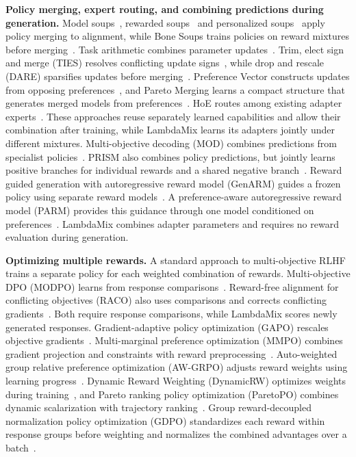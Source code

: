 \documentclass{article} %
\begin{document}
\textbf{Policy merging, expert routing, and combining predictions during generation.} Model soups~\citep{wortsman2022modelsoups}, rewarded soups~\citep{rame2024rewarded} and personalized soups~\citep{jang2023personalized} apply policy merging to alignment, while Bone Soups trains policies on reward mixtures before merging~\citep{bonesoups2025}. Task arithmetic combines parameter updates~\citep{ilharco2023task}. Trim, elect sign and merge (TIES) resolves conflicting update signs~\citep{yadav2023ties}, while drop and rescale (DARE) sparsifies updates before merging~\citep{yu2024dare}. Preference Vector constructs updates from opposing preferences~\citep{prefvector2026}, and Pareto Merging learns a compact structure that generates merged models from preferences~\citep{chen2025paretomerging}. HoE routes among existing adapter experts~\citep{li2026hoe}. These approaches reuse separately learned capabilities and allow their combination after training, while LambdaMix learns its adapters jointly under different mixtures. Multi-objective decoding (MOD) combines predictions from specialist policies~\citep{shi2024mod}. PRISM also combines policy predictions, but jointly learns positive branches for individual rewards and a shared negative branch~\citep{liang2026prism}. Reward guided generation with autoregressive reward model (GenARM) guides a frozen policy using separate reward models~\citep{xu2025genarm}. A preference-aware autoregressive reward model (PARM) provides this guidance through one model conditioned on preferences~\citep{lin2025parm}. LambdaMix combines adapter parameters and requires no reward evaluation during generation.

\textbf{Optimizing multiple rewards.} A standard approach to multi-objective RLHF trains a separate policy for each weighted combination of rewards. Multi-objective DPO (MODPO) learns from response comparisons~\citep{zhou2024modpo}. Reward-free alignment for conflicting objectives (RACO) also uses comparisons and corrects conflicting gradients~\citep{chen2026raco}. Both require response comparisons, while LambdaMix scores newly generated responses. Gradient-adaptive policy optimization (GAPO) rescales objective gradients~\citep{li2025gapo}. Multi-marginal preference optimization (MMPO) combines gradient projection and constraints with reward preprocessing~\citep{mao2026mmpo}. Auto-weighted group relative preference optimization (AW-GRPO) adjusts reward weights using learning progress~\citep{ichihara2025awgrpo}. Dynamic Reward Weighting (DynamicRW) optimizes weights during training~\citep{lu2025dynamicweighting}, and Pareto ranking policy optimization (ParetoPO) combines dynamic scalarization with trajectory ranking~\citep{paretopo2026}. Group reward-decoupled normalization policy optimization (GDPO) standardizes each reward within response groups before weighting and normalizes the combined advantages over a batch~\citep{liu2026gdpo}.
\end{document}
